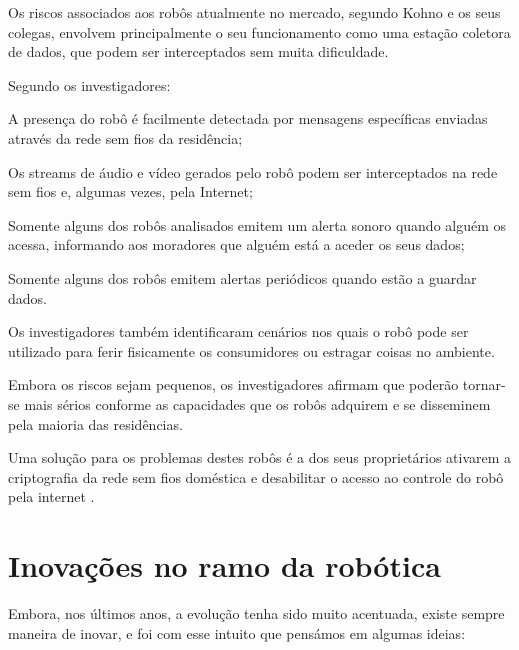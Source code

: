 \documentclass[10pt]{article}
\begin{document}
Os riscos associados aos robôs atualmente no mercado, segundo Kohno e os seus colegas, envolvem principalmente o seu funcionamento como uma estação coletora de dados, que podem ser interceptados sem muita dificuldade.

Segundo os investigadores:

A presença do robô é facilmente detectada por mensagens específicas enviadas através da rede sem fios da residência;

Os streams de áudio e vídeo gerados pelo robô podem ser interceptados na rede sem fios e, algumas vezes, pela Internet;

Somente alguns dos robôs analisados emitem um alerta sonoro quando alguém os acessa, informando aos moradores que alguém está a aceder os seus dados;

Somente alguns dos robôs emitem alertas periódicos quando estão a guardar dados.

Os investigadores também identificaram cenários nos quais o robô pode ser utilizado para ferir fisicamente os consumidores ou estragar coisas no ambiente.

Embora os riscos sejam pequenos, os investigadores afirmam que poderão tornar-se mais sérios conforme as capacidades que os robôs adquirem e se disseminem pela maioria das residências.

Uma solução para os problemas destes robôs é a dos seus proprietários ativarem a criptografia da rede sem fios doméstica e desabilitar o acesso ao controle do robô pela internet \cite{security}.


\section{Inovações no ramo da robótica}

\hspace{\parindent}Embora, nos últimos anos, a evolução tenha sido muito acentuada, existe sempre maneira de inovar, e foi com esse intuito que pensámos em algumas ideias:
\end{document}
